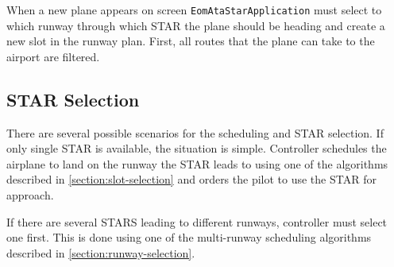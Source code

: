 When a new plane appears on screen \texttt{EomAtaStarApplication} must select to which runway through which STAR the plane should be heading and create a new slot in the runway plan. First, all routes that the plane can take to the airport are filtered.

\subsection{STAR Selection}

There are several possible scenarios for the scheduling and STAR selection. If only single STAR is available, the situation is simple. Controller schedules the airplane to land on the runway the STAR leads to using one of the algorithms described in \ref{section:slot-selection} and orders the pilot to use the STAR for approach.

If there are several STARS leading to different runways, controller must select one first. This is done using one of the multi-runway scheduling algorithms described in \ref{section:runway-selection}.


\providecommand{\cmark}[2][]{\relax}
\providecommand{\cmark}[2][]{
  \begin{pgfonlayer}{marx}
    \node [nmark] at (c#2#1) {#2};
  \end{pgfonlayer}{marx}
  } 

